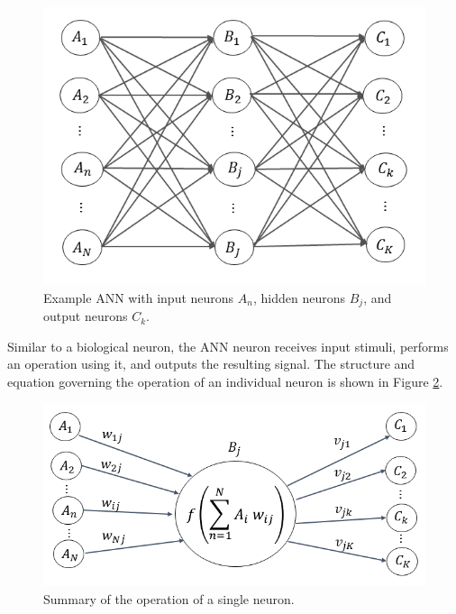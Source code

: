 \begin{figure}[H]
\centering
\includegraphics[width=0.75\linewidth]{images/Network}
\caption{Example ANN with input neurons $A_n$, hidden neurons $B_j$, and output neurons $C_k$.}
\label{fig:Network}
\end{figure}


Similar to a biological neuron, the ANN neuron receives input stimuli, performs an operation using it, and outputs the resulting signal. The structure and equation governing the operation of an individual neuron is shown in Figure \ref{fig:Node}. 

\begin{figure}[H]
	\centering
	\includegraphics[width=0.75\linewidth]{images/Node_ABC_2}
	\caption{Summary of the operation of a single neuron.}
	\label{fig:Node}
\end{figure}

